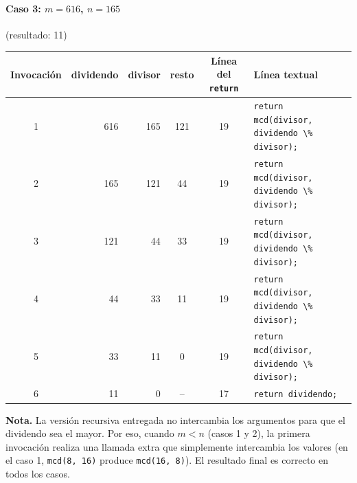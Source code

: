 \documentclass[11pt,a4paper]{article}
\newcommand{\cod}[1]{\lstinline[basicstyle=\ttfamily\footnotesize]|#1|}
\begin{document}
\paragraph{Caso 3: $m=616$, $n=165$} (resultado: 11)
\begin{center}
\footnotesize
\begin{tabular}{c r r c c p{5.2cm}}
\toprule
Invocación & dividendo & divisor & resto & Línea del \texttt{return} & Línea textual \\
\midrule
1 & 616 & 165 & 121 & 19 & \cod{return mcd(divisor, dividendo \% divisor);} \\
2 & 165 & 121 & 44  & 19 & \cod{return mcd(divisor, dividendo \% divisor);} \\
3 & 121 & 44  & 33  & 19 & \cod{return mcd(divisor, dividendo \% divisor);} \\
4 & 44  & 33  & 11  & 19 & \cod{return mcd(divisor, dividendo \% divisor);} \\
5 & 33  & 11  & 0   & 19 & \cod{return mcd(divisor, dividendo \% divisor);} \\
6 & 11  & 0   & --  & 17 & \cod{return dividendo;} \\
\bottomrule
\end{tabular}
\end{center}

\noindent\textbf{Nota.} La versión recursiva entregada no intercambia los argumentos para que el dividendo sea el mayor. Por eso, cuando $m<n$ (casos 1 y 2), la primera invocación realiza una llamada extra que simplemente intercambia los valores (en el caso 1, \texttt{mcd(8, 16)} produce \texttt{mcd(16, 8)}). El resultado final es correcto en todos los casos.
\end{document}
